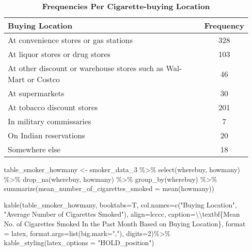 \documentclass[
]{article}
\newenvironment{Shaded}{\begin{snugshade}}{\end{snugshade}}
\newcommand{\AttributeTok}[1]{\textcolor[rgb]{0.77,0.63,0.00}{#1}}
\newcommand{\DecValTok}[1]{\textcolor[rgb]{0.00,0.00,0.81}{#1}}
\newcommand{\FunctionTok}[1]{\textcolor[rgb]{0.00,0.00,0.00}{#1}}
\newcommand{\NormalTok}[1]{#1}
\newcommand{\OtherTok}[1]{\textcolor[rgb]{0.56,0.35,0.01}{#1}}
\newcommand{\SpecialCharTok}[1]{\textcolor[rgb]{0.00,0.00,0.00}{#1}}
\newcommand{\StringTok}[1]{\textcolor[rgb]{0.31,0.60,0.02}{#1}}
\begin{document}
\begin{table}[H]

\caption{\label{tab:importing data for reference}\textbf{Frequencies Per Cigarette-buying Location}}
\centering
\begin{tabular}[t]{lc}
\toprule
Buying Location & Frequency\\
\midrule
At convenience stores or gas stations & 328\\
At liquor stores or drug stores & 103\\
At other discount or warehouse stores such as Wal-Mart or Costco & 46\\
At supermarkets & 30\\
At tobacco discount stores & 201\\
\addlinespace
In military commissaries & 7\\
On Indian reservations & 20\\
Somewhere else & 18\\
\bottomrule
\end{tabular}
\end{table}

\begin{Shaded}
\begin{Highlighting}[]
\NormalTok{table\_smoker\_howmany }\OtherTok{\textless{}{-}}\NormalTok{ smoker\_data\_3 }\SpecialCharTok{\%\textgreater{}\%}
  \FunctionTok{select}\NormalTok{(wherebuy, howmany) }\SpecialCharTok{\%\textgreater{}\%}
  \FunctionTok{drop\_na}\NormalTok{(wherebuy, howmany) }\SpecialCharTok{\%\textgreater{}\%}
  \FunctionTok{group\_by}\NormalTok{(wherebuy) }\SpecialCharTok{\%\textgreater{}\%}
  \FunctionTok{summarize}\NormalTok{(}\AttributeTok{mean\_number\_of\_cigarettes\_smoked =} \FunctionTok{mean}\NormalTok{(howmany))}

\FunctionTok{kable}\NormalTok{(table\_smoker\_howmany, }
      \AttributeTok{booktabs=}\NormalTok{T, }
      \AttributeTok{col.names=}\FunctionTok{c}\NormalTok{(}\StringTok{"Buying Location"}\NormalTok{, }\StringTok{"Average Number of Cigarettes Smoked"}\NormalTok{),  }
      \AttributeTok{align=}\StringTok{\textquotesingle{}lcccc\textquotesingle{}}\NormalTok{, }
      \AttributeTok{caption=}\StringTok{\textquotesingle{}}\SpecialCharTok{\textbackslash{}\textbackslash{}}\StringTok{textbf\{Mean No. of Cigarettes Smoked In}
\StringTok{      the Past Month Based on Buying Location\}\textquotesingle{}}\NormalTok{,}
      \AttributeTok{format =} \StringTok{\textquotesingle{}latex\textquotesingle{}}\NormalTok{,}
      \AttributeTok{format.args=}\FunctionTok{list}\NormalTok{(}\AttributeTok{big.mark=}\StringTok{","}\NormalTok{), }\AttributeTok{digits=}\DecValTok{2}\NormalTok{)}\SpecialCharTok{\%\textgreater{}\%}
  \FunctionTok{kable\_styling}\NormalTok{(}\AttributeTok{latex\_options =} \StringTok{"HOLD\_position"}\NormalTok{)}
\end{Highlighting}
\end{Shaded}
\end{document}
